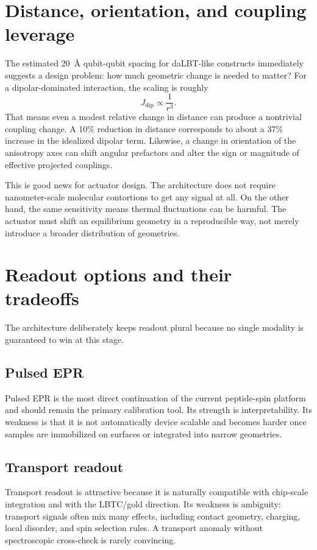 \documentclass[11pt]{report}
\newcommand{\lbtc}{LBTC}
\newcommand{\dalbt}{daLBT}
\theoremstyle{definition}
\begin{document}
\section{Distance, orientation, and coupling leverage}
The estimated 20~\AA{} qubit-qubit spacing for \dalbt{}-like constructs immediately suggests a design problem: how much geometric change is needed to matter? For a dipolar-dominated interaction, the scaling is roughly
\[
J_{\mathrm{dip}} \propto \frac{1}{r^3}.
\]
That means even a modest relative change in distance can produce a nontrivial coupling change. A 10\% reduction in distance corresponds to about a 37\% increase in the idealized dipolar term. Likewise, a change in orientation of the anisotropy axes can shift angular prefactors and alter the sign or magnitude of effective projected couplings.

This is good news for actuator design. The architecture does not require nanometer-scale molecular contortions to get any signal at all. On the other hand, the same sensitivity means thermal fluctuations can be harmful. The actuator must shift an equilibrium geometry in a reproducible way, not merely introduce a broader distribution of geometries.

\section{Readout options and their tradeoffs}
The architecture deliberately keeps readout plural because no single modality is guaranteed to win at this stage.

\subsection{Pulsed EPR}
Pulsed EPR is the most direct continuation of the current peptide-spin platform and should remain the primary calibration tool. Its strength is interpretability. Its weakness is that it is not automatically device scalable and becomes harder once samples are immobilized on surfaces or integrated into narrow geometries.

\subsection{Transport readout}
Transport readout is attractive because it is naturally compatible with chip-scale integration and with the \lbtc{}/gold direction. Its weakness is ambiguity: transport signals often mix many effects, including contact geometry, charging, local disorder, and spin selection rules. A transport anomaly without spectroscopic cross-check is rarely convincing.
\end{document}
